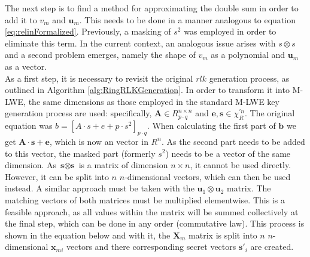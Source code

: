The next step is to find a method for approximating the double sum in order to add it to $v_m$ and $\textbf{u}_m$. This needs to be done in a manner analogous to equation \ref{eq:relinFormalized}. Previously, a masking of $s^2$ was employed in order to eliminate this term. In the current context, an analogous issue arises with $s \otimes s$ and a second problem emerges, namely the shape of $v_m$ as a polynomial and $\textbf{u}_m$ as a vector. \\
As a first step, it is necessary to revisit the original $rlk$ generation process, as outlined in Algorithm \ref{alg:RingRLKGeneration}. In order to transform it into M-LWE, the same dimensions as those employed in the standard M-LWE key generation process are used: specifically, $\textbf{A} \in R^{n \times n}_{p \cdot q}$ and $\textbf{e}, \textbf{s} \in \chi^{'n}_{R}$. The original equation was $b = [A\cdot s+e+p\cdot s^2]_{p \cdot q}$. When calculating the first part of $\textbf{b}$ we get $\textbf{A}\cdot \textbf{s} + \textbf{e}$, which is now an vector in $R^n$. As the second part needs to be added to this vector, the masked part (formerly $s^2$) needs to be a vector of the same dimension. As $\textbf{s} \otimes \textbf{s}$ is a matrix of dimension $n \times n$, it cannot be used directly. However, it can be split into $n$ $n$-dimensional vectors, which can then be used instead. A similar approach must be taken with the $\textbf{u}_1 \otimes \textbf{u}_2$ matrix. The matching vectors of both matrices must be multiplied elementwise. This is a feasible approach, as all values within the matrix will be summed collectively at the final step, which can be done in any order (commutative law). This process is shown in the equation below and with it, the $\textbf{X}_m$ matrix is split into $n$ $n$-dimensional $\textbf{x}_{mi}$ vectors and there corresponding secret vectors $\textbf{s}'_i$ are created.


